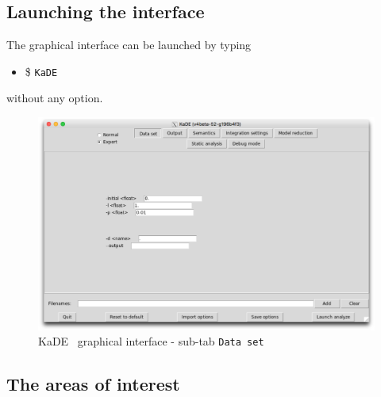 \documentclass[11pt]{book}
\def\KaDE{\textsf{KaDE}}
\def\ttt#1{\texttt{#1}}
\def\ITE#1{\begin{itemize}#1\end{itemize}}
\begin{document}
\subsection{Launching the interface}

The graphical interface can be launched by typing
\ITE{\item[\$] \ttt{KaDE}}

without any option.

\begin{figure}[htbp]
\centering
\includegraphics[width=12cm,bb=0 0 1904 1208]{img/kade_0.png}
\caption{\KaDE~ graphical interface - sub-tab \texttt{Data set}}
\label{fig:kade:0}
\end{figure}

\subsection{The areas of interest}
\end{document}
